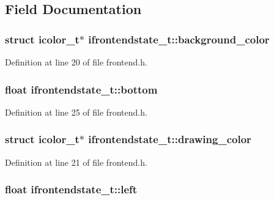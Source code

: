 \subsection{Field Documentation}
\hypertarget{structifrontendstate__t_afb7c49000e593f77bcb30b1ae4384ded}{
\subsubsection[{background\-\_\-color}]{\setlength{\rightskip}{0pt plus 5cm}struct {\bf icolor\-\_\-t}$\ast$ ifrontendstate\-\_\-t\-::background\-\_\-color}}\label{structifrontendstate__t_afb7c49000e593f77bcb30b1ae4384ded}


Definition at line 20 of file frontend.\-h.

\hypertarget{structifrontendstate__t_adc025993349dceae53dfe235f84fdef2}{
\subsubsection[{bottom}]{\setlength{\rightskip}{0pt plus 5cm}float ifrontendstate\-\_\-t\-::bottom}}\label{structifrontendstate__t_adc025993349dceae53dfe235f84fdef2}


Definition at line 25 of file frontend.\-h.

\hypertarget{structifrontendstate__t_ac81d750ec8cd1ba1d44e2c0f55bea687}{
\subsubsection[{drawing\-\_\-color}]{\setlength{\rightskip}{0pt plus 5cm}struct {\bf icolor\-\_\-t}$\ast$ ifrontendstate\-\_\-t\-::drawing\-\_\-color}}\label{structifrontendstate__t_ac81d750ec8cd1ba1d44e2c0f55bea687}


Definition at line 21 of file frontend.\-h.

\hypertarget{structifrontendstate__t_a54ee910059c66c18fa1bb1555d0e61c5}{
\subsubsection[{left}]{\setlength{\rightskip}{0pt plus 5cm}float ifrontendstate\-\_\-t\-::left}}\label{structifrontendstate__t_a54ee910059c66c18fa1bb1555d0e61c5}


